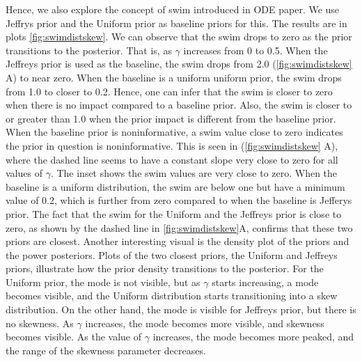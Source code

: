 \documentclass[12pt]{article}
\begin{document}
Hence, we also explore the concept of \gls{swim} introduced in ODE paper. We use Jeffrys prior and the Uniform prior as baseline priors for this. The results are in plots \cref{fig:swimdistskew}. We can observe that the \gls{swim} drops to zero as the prior transitions to the posterior. That is, as $\gamma$ increases from 0 to 0.5. When the Jeffreys prior is used as the baseline, the \gls{swim}  drops from 2.0 (\cref{fig:swimdistskew} A) to near zero. When the baseline is a uniform uniform prior, the \gls{swim} drops from 1.0 to closer to 0.2. Hence, one can infer that the \gls{swim} is closer to zero when there is no impact compared to a baseline prior. Also, the \gls{swim} is closer to or greater than 1.0 when the prior impact is different from the baseline prior. When the baseline prior is noninformative, a \gls{swim} value close to zero indicates the prior in question is noninformative. This is seen in (\cref{fig:swimdistskew} A), where the dashed line seems to have a constant slope very close to zero for all values of $\gamma$. The inset shows the \gls{swim} values are very close to zero. When the baseline is a uniform distribution, the \gls{swim} are below one but have a minimum value of 0.2, which is further from zero compared to when the baseline is Jefferys prior. The fact that the \gls{swim} for the Uniform and the Jeffreys prior is close to zero, as shown by the dashed line in \cref{fig:swimdistskew}A, confirms that these two priors are closest. Another interesting visual is the density plot of the priors and the power posteriors. Plots of the two closest priors, the Uniform and Jeffreys priors, illustrate how the prior density transitions to the posterior. For the Uniform prior, the mode is not visible, but as $\gamma$ starts increasing, a mode becomes visible, and the Uniform distribution starts transitioning into a skew distribution. On the other hand, the mode is visible for Jeffreys prior, but there is no skewness. As $\gamma$ increases, the mode becomes more visible, and skewness becomes visible. As the value of $\gamma$ increases, the mode becomes more peaked, and the range of the skewness parameter decreases.
\end{document}
